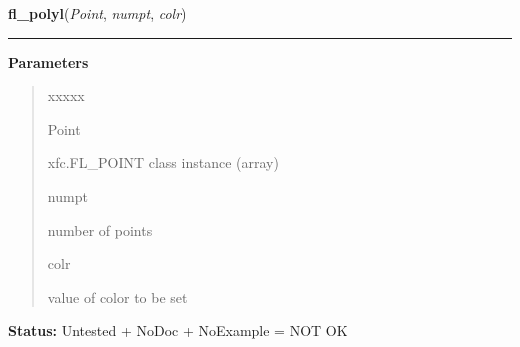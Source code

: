 \hspace{.8\funcindent}\begin{boxedminipage}{\funcwidth}

    \raggedright \textbf{fl\_polyl}(\textit{Point}, \textit{numpt}, \textit{colr})

    \vspace{-1.5ex}

    \rule{\textwidth}{0.5\fboxrule}
\setlength{\parskip}{2ex}
\setlength{\parskip}{1ex}
      \textbf{Parameters}
      \vspace{-1ex}

      \begin{quote}
        \begin{Ventry}{xxxxx}

          \item[Point]

          xfc.FL\_POINT class instance (array)

          \item[numpt]

          number of points

          \item[colr]

          value of color to be set

        \end{Ventry}

      \end{quote}

\textbf{Status:} Untested + NoDoc + NoExample = NOT OK



    \end{boxedminipage}

    \label{xformslib:library:fl_polybound}

    \vspace{0.5ex}

